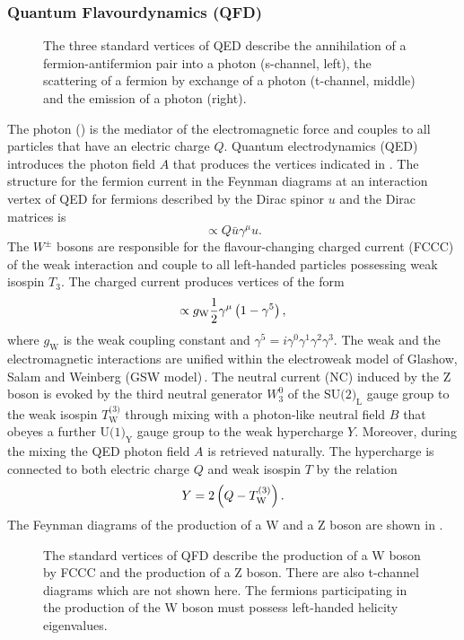 \subsubsection{Quantum Flavourdynamics (QFD)}\label{subsec:QFD}
\begin{figure}[h!]
    \centering
    
    \caption[Standard vertices of QED.]{The three standard vertices of QED describe the annihilation of a fermion-antifermion pair into a photon (s-channel, left), 
    the scattering of a fermion by exchange of a photon (t-channel, middle) and the emission of a photon (right).}\label{theory:QED_vertices}
\end{figure}
The photon (\gamma) is the mediator of the electromagnetic force and couples to all particles that have an electric charge $Q$. 
Quantum electrodynamics (QED) introduces the photon field $A$ that produces the vertices indicated in . The structure
for the fermion current in the Feynman diagrams at an interaction vertex of QED for fermions described by the Dirac spinor $u$ and the Dirac matrices is
\begin{equation}
    \propto Q \bar{u}\gamma^\mu u.  
\end{equation}
The $W^{\pm}$ bosons are responsible for the flavour-changing charged current (FCCC) of the weak interaction and couple to all left-handed particles possessing weak isospin $T_\text{3}$. 
The charged current produces vertices of the form
\begin{equation}
    \propto g_\text{W}\frac{1}{2}\gamma^\mu \left( 1-\gamma^5\right),
\end{equation}
where $g_\text{W}$ is the weak coupling constant and $\gamma^5 = i\gamma^0\gamma^1\gamma^2\gamma^3$.\newline{}
The weak and the electromagnetic interactions
are unified within the electroweak model of Glashow, Salam and Weinberg (GSW model)\,\cite{Klapdor1989}. The neutral current (NC) induced by the Z boson is evoked by the third neutral generator $W_3^0$ of the $\text{SU(2)}_\text{L}$ gauge group to the weak isospin $T^\text{(3)}_\text{W}$ through 
mixing with a photon-like neutral field $B$ that obeyes a further $\text{U(1)}_\text{Y}$ gauge group to the weak hypercharge $Y$. Moreover, during the mixing the QED photon field $A$ is retrieved naturally. The hypercharge
is connected to both electric charge $Q$ and weak isospin $T$ by the relation
\begin{equation}
    Y = 2 \left( Q - T_\text{W}^{\left( 3 \right)} \right). 
\end{equation}
The Feynman diagrams of the production of a W and a Z boson are shown in .
\begin{figure}[h!]
    \centering
    
    \caption[Weak boson production Feynman graphs.]{The standard vertices of QFD describe the production of a W boson by FCCC and the production of a Z boson. There are also t-channel diagrams which are not shown here. 
            The fermions participating in the production of the W boson must possess left-handed helicity eigenvalues. }\label{theory:QFD_vertices}
\end{figure}

